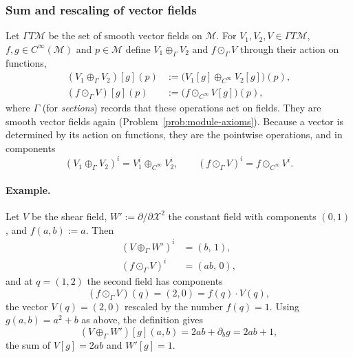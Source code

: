 \documentclass[11pt]{article}
\newcommand{\Cinf}{C^\infty(\mathcal M)}
\begin{document}
\subsubsection*{Sum and rescaling of vector fields}
Let $\Gamma T\mathcal M$ be the set of smooth vector fields on $\mathcal M$. For $V_1,V_2,V\in\Gamma T\mathcal M$, $f,g\in\Cinf$ and $p\in\mathcal M$ define $V_1\oplus_\Gamma V_2$ and $f\odot_\Gamma V$ through their action on functions,
\begin{align*}
(V_1\oplus_\Gamma V_2)[g](p)&:=\big(V_1[g]\oplus_{C^\infty}V_2[g]\big)(p),\\
(f\odot_\Gamma V)[g](p)&:=\big(f\odot_{C^\infty}V[g]\big)(p),
\end{align*}
where $\Gamma$ (for \emph{sections}) records that these operations act on fields. They are smooth vector fields again (Problem~\ref{prob:module-axioms}). Because a vector is determined by its action on functions, they are the pointwise operations, and in components
\[
(V_1\oplus_\Gamma V_2)^i=V_1^i\oplus_{C^\infty}V_2^i,\qquad (f\odot_\Gamma V)^i=f\odot_{C^\infty}V^i.
\]

\paragraph{Example.} Let $V$ be the shear field, $W':=\partial/\partial\mathcal X^2$ the constant field with components $(0,1)$, and $f(a,b):=a$. Then
\begin{align*}
(V\oplus_\Gamma W')^i&=(b,\,1),\\
(f\odot_\Gamma V)^i&=(ab,\,0),
\end{align*}
and at $q=(1,2)$ the second field has components
\[
(f\odot_\Gamma V)(q)=(2,0)=f(q)\cdot V(q),
\]
the vector $V(q)=(2,0)$ rescaled by the number $f(q)=1$. Using $g(a,b)=a^2+b$ as above, the definition gives
\[
(V\oplus_\Gamma W')[g](a,b)=2ab+\partial_bg=2ab+1,
\]
the sum of $V[g]=2ab$ and $W'[g]=1$.
\end{document}
